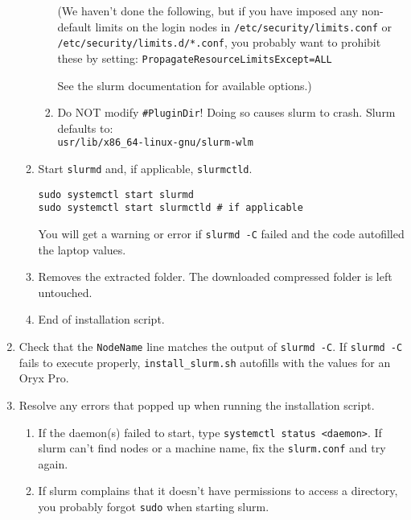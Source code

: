 \begin{enumerate}
\begin{enumerate}
\begin{enumerate}
		(We haven't done the following, but if you have imposed any non-default limits on the login nodes in \texttt{/etc/security/limits.conf} or \texttt{/etc/security/limits.d/*.conf}, you probably want to prohibit these by setting: 
		\texttt{PropagateResourceLimitsExcept=ALL}
	
		See the slurm documentation for available options.)

		\item Do NOT modify \texttt{\#PluginDir}! Doing so causes slurm to crash. Slurm defaults to: \\
		\texttt{usr/lib/x86\_64-linux-gnu/slurm-wlm}
		\end{enumerate} 

	\item Start \texttt{slurmd} and, if applicable, \texttt{slurmctld}.

	\texttt{sudo systemctl start slurmd} \\
	\texttt{sudo systemctl start slurmctld \quad \# if applicable}

	You will get a warning or error if \texttt{slurmd -C} failed and the code autofilled the laptop values.

	\item Removes the extracted folder. The downloaded compressed folder is left untouched.
	
	\item End of installation script.
	\end{enumerate}
	
\item Check that the \texttt{NodeName} line matches the output of \texttt{slurmd -C}. If \texttt{slurmd -C} fails to execute properly, \texttt{install\_slurm.sh} autofills with the values for an Oryx Pro.

\item Resolve any errors that popped up when running the installation script.

	\begin{enumerate}
	\item If the daemon(s) failed to start, type \texttt{systemctl status <daemon>}. If slurm can't find nodes or a machine name, fix the \texttt{slurm.conf} and try again. 

	\item If slurm complains that it doesn't have permissions to access a directory, you probably forgot \texttt{sudo} when starting slurm.


\end{enumerate}
\end{enumerate}
